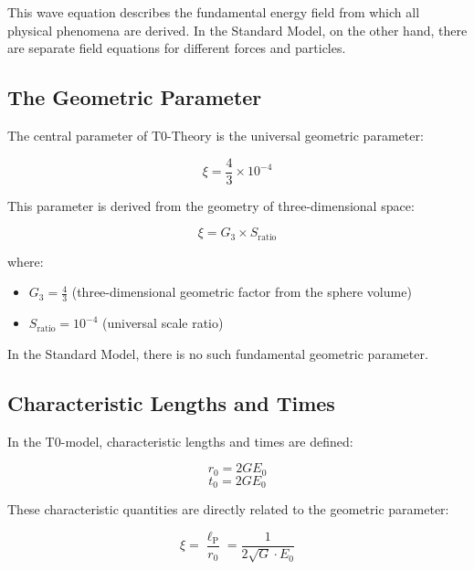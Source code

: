 \documentclass[12pt,a4paper]{article}
\newcommand{\lp}{\ell_{\text{P}}}
\theoremstyle{definition}
\begin{document}
	This wave equation describes the fundamental energy field from which all physical phenomena are derived. In the Standard Model, on the other hand, there are separate field equations for different forces and particles.
	
	\subsection{The Geometric Parameter}
	
	The central parameter of T0-Theory is the universal geometric parameter:
	
	\begin{equation}
		\boxed{\xi = \frac{4}{3} \times 10^{-4}}
	\end{equation}
	
	This parameter is derived from the geometry of three-dimensional space:
	
	\begin{equation}
		\xi = G_3 \times S_{\text{ratio}}
	\end{equation}
	
	where:
	\begin{itemize}
		\item $G_3 = \frac{4}{3}$ (three-dimensional geometric factor from the sphere volume)
		\item $S_{\text{ratio}} = 10^{-4}$ (universal scale ratio)
	\end{itemize}
	
	In the Standard Model, there is no such fundamental geometric parameter.
	
	\subsection{Characteristic Lengths and Times}

In the T0-model, characteristic lengths and times are defined:

\begin{equation}
	\boxed{r_0 = 2GE_0}
\end{equation}
\begin{equation}
	\boxed{t_0 = 2GE_0}
\end{equation}

These characteristic quantities are directly related to the geometric parameter:

\begin{equation}
	\xi = \frac{\lp}{r_0} = \frac{1}{2\sqrt{G} \cdot E_0}
\end{equation}
\end{document}
